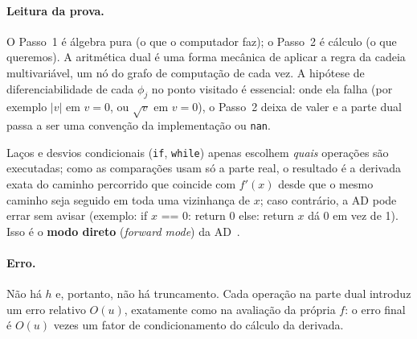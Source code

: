\documentclass[11pt,a4paper]{article}
\begin{document}
\paragraph{Leitura da prova.} O Passo~1 é álgebra pura (o que o computador faz); o Passo~2 é cálculo (o que queremos). A aritmética dual é uma forma mecânica de aplicar a regra da cadeia multivariável, um nó do grafo de computação de cada vez. A hipótese de diferenciabilidade de cada $\phi_j$ no ponto visitado é essencial: onde ela falha (por exemplo $|v|$ em $v=0$, ou $\sqrt v$ em $v=0$), o Passo~2 deixa de valer e a parte dual passa a ser uma convenção da implementação ou \texttt{nan}.

Laços e desvios condicionais (\texttt{if}, \texttt{while}) apenas escolhem \emph{quais} operações são executadas; como as comparações usam só a parte real, o resultado é a derivada exata do caminho percorrido que coincide com $f'(x)$ desde que o mesmo caminho seja seguido em toda uma vizinhança de $x$; caso contrário, a AD pode errar sem avisar (exemplo: if $x$ == 0: return 0 else: return $x$ dá 0 em vez de 1). Isso é o \textbf{modo direto} (\emph{forward mode}) da AD~\cite{baydin2018}.

\paragraph{Erro.} Não há $h$ e, portanto, não há truncamento. Cada operação na parte dual introduz um erro relativo $O(u)$, exatamente como na avaliação da própria $f$: o erro final é $O(u)$ vezes um fator de condicionamento do cálculo da derivada.
\end{document}
